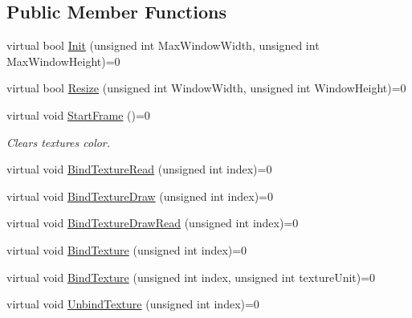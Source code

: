 \subsection*{Public Member Functions}
\begin{DoxyCompactItemize}
\item 
virtual bool \mbox{\hyperlink{class_geometry_engine_1_1_geometry_buffer_1_1_i_buffer_ace4f0f514bf5a96790fbfffe515dcc0b}{Init}} (unsigned int Max\+Window\+Width, unsigned int Max\+Window\+Height)=0
\item 
virtual bool \mbox{\hyperlink{class_geometry_engine_1_1_geometry_buffer_1_1_i_buffer_a3b764e340ccb06bee072d1bd95b007df}{Resize}} (unsigned int Window\+Width, unsigned int Window\+Height)=0
\item 
\mbox{\label{class_geometry_engine_1_1_geometry_buffer_1_1_i_buffer_a229532059b1944a12303756f25f6cb16}} 
virtual void \mbox{\hyperlink{class_geometry_engine_1_1_geometry_buffer_1_1_i_buffer_a229532059b1944a12303756f25f6cb16}{Start\+Frame}} ()=0
\begin{DoxyCompactList}\small\item\em Clears textures color. \end{DoxyCompactList}\item 
virtual void \mbox{\hyperlink{class_geometry_engine_1_1_geometry_buffer_1_1_i_buffer_ab4c82eeb6d07ea902e0de3fad67c29f2}{Bind\+Texture\+Read}} (unsigned int index)=0
\item 
virtual void \mbox{\hyperlink{class_geometry_engine_1_1_geometry_buffer_1_1_i_buffer_ac5b3fcf3ea4dfc4e5530cb0f4a9005a6}{Bind\+Texture\+Draw}} (unsigned int index)=0
\item 
virtual void \mbox{\hyperlink{class_geometry_engine_1_1_geometry_buffer_1_1_i_buffer_a21843472d95d9c495a5df733ef2a64e3}{Bind\+Texture\+Draw\+Read}} (unsigned int index)=0
\item 
virtual void \mbox{\hyperlink{class_geometry_engine_1_1_geometry_buffer_1_1_i_buffer_a3fba26797c5d4033b559c01d6f62dab5}{Bind\+Texture}} (unsigned int index)=0
\item 
virtual void \mbox{\hyperlink{class_geometry_engine_1_1_geometry_buffer_1_1_i_buffer_a7fdf65d272575189e26ca13d169e8317}{Bind\+Texture}} (unsigned int index, unsigned int texture\+Unit)=0
\item 
virtual void \mbox{\hyperlink{class_geometry_engine_1_1_geometry_buffer_1_1_i_buffer_a6130240d58d277cb9e897dfd1924613e}{Unbind\+Texture}} (unsigned int index)=0

\end{DoxyCompactItemize}
